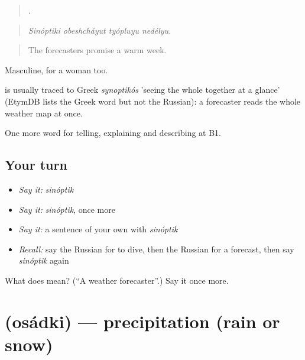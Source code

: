 \begin{quote}
   .
\end{quote}

\begin{quote}
\emph{Sinóptiki obeshcháyut tyópluyu nedélyu.}
\end{quote}

\begin{quote}
The forecasters promise a warm week.
\end{quote}

Masculine, for a woman too.

\begin{cousinweb}
\emph{} is usually traced to Greek \emph{synoptikós} 'seeing the whole together at a glance' (EtymDB lists the Greek word but not the Russian): a forecaster reads the whole weather map at once.
\end{cousinweb}

\begin{grammarlens}[title={What you've built}]
One more word for telling, explaining and describing at B1.
\end{grammarlens}

\subsection*{Your turn}
\begin{itemize}
\raggedright
  \item \emph{Say it:} \emph{sinóptik}
  \item \emph{Say it:} \emph{sinóptik}, once more
  \item \emph{Say it:} a sentence of your own with \emph{sinóptik}
  \item \emph{Recall:} say the Russian for to dive, then the Russian for a forecast, then say \emph{sinóptik} again
\end{itemize}

\begin{tcolorbox}[breakable,colback=teal!4,colframe=teal!35!black,title={Before you move on}]
What does  mean? (\textquotedblleft{}A weather forecaster\textquotedblright{}.) Say it once more.
\end{tcolorbox}
\section[\texorpdfstring{\ru{осадки} (osádki)}{осадки (osádki)}]{ (osádki) — precipitation (rain or snow)}

